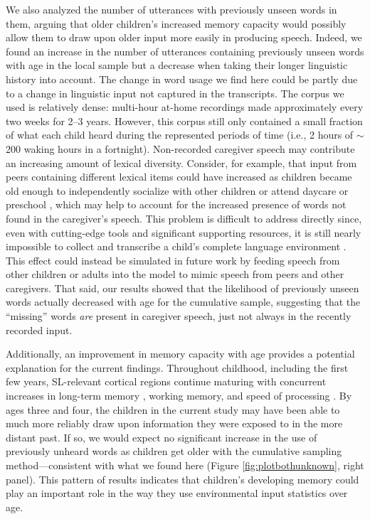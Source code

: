 \documentclass{article}
\begin{document}
We also analyzed the number of utterances with previously unseen words in them, arguing that older children's increased memory capacity \cite{bauer2005developments, gathercole2004structure, wojcik2013remembering} would possibly allow them to draw upon older input more easily in producing speech. Indeed, we found an increase in the number of utterances containing previously unseen words with age in the local sample but a decrease when taking their longer linguistic history into account. The change in word usage we find here could be partly due to a change in linguistic input not captured in the transcripts. The corpus we used is relatively dense: multi-hour at-home recordings made approximately every two weeks for 2--3 years. However, this corpus still only contained a small fraction of what each child heard during the represented periods of time (i.e., 2 hours of $\sim$200 waking hours in a fortnight). Non-recorded caregiver speech may contribute an increasing amount of lexical diversity. Consider, for example, that input from peers containing different lexical items could have increased as children became old enough to independently socialize with other children or attend daycare or preschool \cite{hoff2010context, hoff1991older, mannle1992twoyearolds}, which may help to account for the increased presence of words not found in the caregiver's speech. This problem is difficult to address directly since, even with cutting-edge tools and significant supporting resources, it is still nearly impossible to collect and transcribe a child's complete language environment \cite{casillasURstep, roy2009exploring}. This effect could instead be simulated in future work by feeding speech from other children or adults into the model to mimic speech from peers and other caregivers. That said, our results showed that the likelihood of previously unseen words actually decreased with age for the cumulative sample, suggesting that the ``missing'' words \textit{are} present in caregiver speech, just not always in the recently recorded input.

Additionally, an improvement in memory capacity with age provides a potential explanation for the current findings. Throughout childhood, including the first few years, SL-relevant cortical regions continue maturing \cite{casey2000structural, diamond2002normal, rodriguez2009neurophysiological, uylings2006development} with concurrent increases in long-term memory \cite{bauer2005developments, wojcik2013remembering}, working memory, and speed of processing \cite{gathercole2004structure, kail1991developmental}. By ages three and four, the children in the current study may have been able to much more reliably draw upon information they were exposed to in the more distant past. If so, we would expect no significant increase in the use of previously unheard words as children get older with the cumulative sampling method---consistent with what we found here (Figure \ref{fig:plotbothunknown}, right panel). This pattern of results indicates that children's developing memory could play an important role in the way they use environmental input statistics over age.
\end{document}

